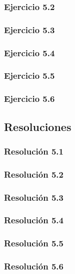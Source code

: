 \subsubsection{Ejercicio 5.2}


\subsubsection{Ejercicio 5.3}


\subsubsection{Ejercicio 5.4}


\subsubsection{Ejercicio 5.5}


\subsubsection{Ejercicio 5.6}


\subsection{Resoluciones}

\subsubsection{Resolución 5.1}


\subsubsection{Resolución 5.2}


\subsubsection{Resolución 5.3}


\subsubsection{Resolución 5.4}


\subsubsection{Resolución 5.5}


\subsubsection{Resolución 5.6}

